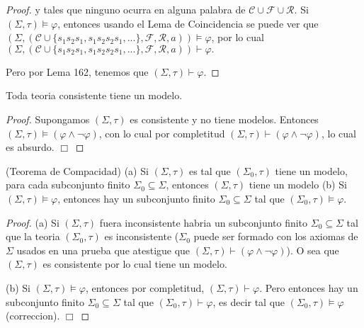 \begin{proof}
    y tales que ninguno ocurra en alguna palabra de \(\mathcal{C}\cup \mathcal{F} \cup \mathcal{R}.\) Si \((\Sigma ,\tau )\models \varphi \), entonces usando el Lema de Coincidencia se puede ver que \((\Sigma ,(\mathcal{C}\cup \{s_{1}s_{2}s_{1},s_{1}s_{2}s_{2}s_{1},...\},\mathcal{F},\mathcal{R} ,a))\models \varphi \), por lo cual
    \(\displaystyle (\Sigma ,(\mathcal{C}\cup \{s_{1}s_{2}s_{1},s_{1}s_{2}s_{2}s_{1},...\}, \mathcal{F},\mathcal{R},a))\vdash \varphi . \)

    Pero por Lema 162, tenemos que \((\Sigma ,\tau )\vdash \varphi .\)
  \end{proof}

  \begin{corollary}
    Toda teoria consistente tiene un modelo.
  \end{corollary}
  \begin{proof}
    Supongamos \((\Sigma ,\tau )\) es consistente y no tiene modelos. Entonces \( (\Sigma ,\tau )\models \left( \varphi \wedge \lnot \varphi \right) \), con lo cual por completitud \((\Sigma ,\tau )\vdash \left( \varphi \wedge \lnot \varphi \right) \), lo cual es absurdo. \(\Box\)
  \end{proof}

  \begin{corollary}
    (Teorema de Compacidad)
    (a) Si \((\Sigma ,\tau )\) es tal que \((\Sigma _{0},\tau )\) tiene un modelo, para cada subconjunto finito \(\Sigma _{0}\subseteq \Sigma \), entonces \((\Sigma ,\tau )\) tiene un modelo
    (b) Si \((\Sigma ,\tau )\models \varphi \), entonces hay un subconjunto finito \(\Sigma _{0}\subseteq \Sigma \) tal que \((\Sigma _{0},\tau )\models \varphi \).
  \end{corollary}
  \begin{proof}
    (a) Si \((\Sigma ,\tau )\) fuera inconsistente habria un subconjunto finito \( \Sigma _{0}\subseteq \Sigma \) tal que la teoria \((\Sigma _{0},\tau )\) es inconsistente (\(\Sigma _{0}\) puede ser formado con los axiomas de \(\Sigma \) usados en una prueba que atestigue que \((\Sigma ,\tau )\vdash \left( \varphi \wedge \lnot \varphi \right) \)). O sea que \((\Sigma ,\tau )\) es consistente por lo cual tiene un modelo.

    (b) Si \((\Sigma ,\tau )\models \varphi \), entonces por completitud, \((\Sigma ,\tau )\vdash \varphi \). Pero entonces hay un subconjunto finito \(\Sigma _{0}\subseteq \Sigma \) tal que \((\Sigma _{0},\tau )\vdash \varphi \), es decir tal que \((\Sigma _{0},\tau )\models \varphi \) (correccion). \(\Box\)
  \end{proof}

